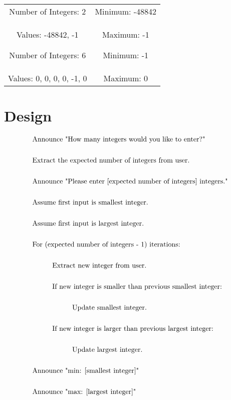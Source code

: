 \documentclass[12pt]{article}
\begin{document}
\begin{tabular}{c|c}
  \makecell{Number of Integers: 2 \\ \\ Values: -48842, -1} & \makecell{Minimum: -48842 \\ \\ Maximum: -1} \\ \\
  \hline \\
  \makecell{Number of Integers: 6 \\ \\ Values: 0, 0, 0, 0, -1, 0} & \makecell{Minimum: -1 \\ \\ Maximum: 0}   \\
\end{tabular}

\section*{Design}
\begin{align*}
  &\text{Announce "How many integers would you like to enter?"} \\ \\
  &\text{Extract the expected number of integers from user.} \\ \\
  &\text{Announce "Please enter [expected number of integers] integers."} \\ \\
  &\text{Assume first input is smallest integer.} \\ \\
  &\text{Assume first input is largest integer.} \\ \\
  &\text{For (expected number of integers - 1) iterations:} \\ \\
  & \hspace*{10mm} \text{Extract new integer from user.} \\ \\
  & \hspace*{10mm} \text{If new integer is smaller than previous smallest integer:} \\ \\
  & \hspace*{20mm} \text{Update smallest integer.} \\ \\
  & \hspace*{10mm} \text{If new integer is larger than previous largest integer:} \\ \\
  & \hspace*{20mm} \text{Update largest integer.} \\ \\
  &\text{Announce "min: [smallest integer]"} \\ \\
  &\text{Announce "max: [largest integer]"}
\end{align*}
\end{document}
